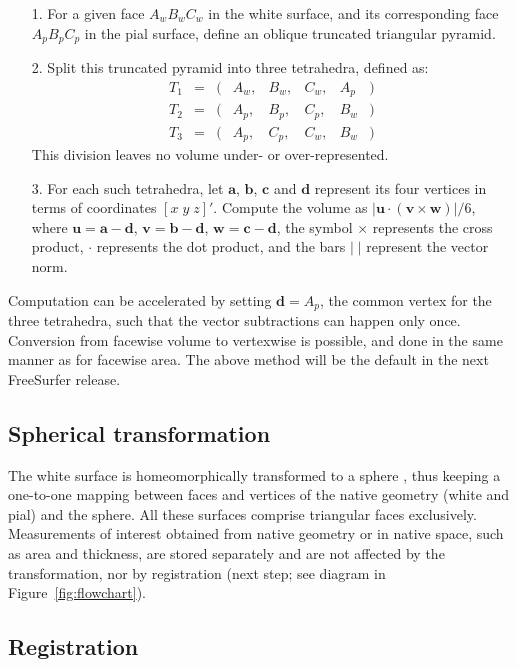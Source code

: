 \begin{itemize}[leftmargin=*]
\item[1.] For a given face $A_w B_w C_w$ in the white surface, and its corresponding face $A_p B_p C_p$ in the pial surface, define an oblique truncated triangular pyramid.
\item[2.] Split this truncated pyramid into three tetrahedra, defined as:
$$
\begin{array}{lcllllll}
T_1 &=& (&A_w,&B_w,&C_w,&A_p&)\\
T_2 &=& (&A_p,&B_p,&C_p,&B_w&)\\
T_3 &=& (&A_p,&C_p,&C_w,&B_w&)
\end{array}$$
This division leaves no volume under- or over-represented.
\item[3.] For each such tetrahedra, let $\mathbf{a}$, $\mathbf{b}$, $\mathbf{c}$ and $\mathbf{d}$ represent its four vertices in terms of coordinates $[x\;y\;z]'$. Compute the volume as $|\mathbf{u}\cdot(\mathbf{v} \times \mathbf{w})|/6$, where $\mathbf{u} = \mathbf{a}-\mathbf{d}$, $\mathbf{v} = \mathbf{b}-\mathbf{d}$, $\mathbf{w} = \mathbf{c}-\mathbf{d}$, the symbol $\times$ represents the cross product, $\cdot$ represents the dot product, and the bars $|\;|$ represent the vector norm.
\end{itemize}

\noindent
Computation can be accelerated by setting $\mathbf{d}=A_p$, the common vertex for the three tetrahedra, such that the vector subtractions can happen only once. Conversion from facewise volume to vertexwise is possible, and done in the same manner as for facewise area. The above method will be the default in the next FreeSurfer release.

\subsection{Spherical transformation}

The white surface is homeomorphically transformed to a sphere \citep{Fischl1999_intersubject}, thus keeping a one-to-one mapping between faces and vertices of the native geometry (white and pial) and the sphere. All these surfaces comprise triangular faces exclusively. Measurements of interest obtained from native geometry or in native space, such as area and thickness, are stored separately and are not affected by the transformation, nor by registration (next step; see diagram in Figure~\ref{fig:flowchart}).

\subsection{Registration}

